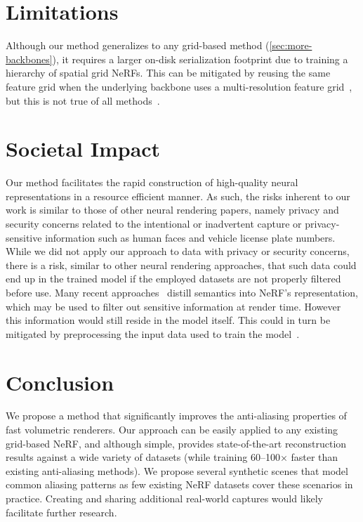 \documentclass{article}
\begin{document}
\section{Limitations}
\label{sec:limitations}

Although our method generalizes to any grid-based method (\cref{sec:more-backbones}), it requires a larger on-disk serialization footprint due to training a hierarchy of spatial grid NeRFs. This can be mitigated by reusing the same feature grid when the underlying backbone uses a multi-resolution feature grid~\cite{mueller2022instant, kplanes_2023}, but this is not true of all methods~\cite{Chen2022ECCV, yu_and_fridovichkeil2021plenoxels}.

\section{Societal Impact}

Our method facilitates the rapid construction of high-quality neural representations in a resource efficient manner. As such, the risks inherent to our work is similar to those of other neural rendering papers, namely privacy and security concerns related to the intentional or inadvertent capture or privacy-sensitive information such as human faces and vehicle license plate numbers. While we did not apply our approach to data with privacy or security concerns, there is a risk, similar to other neural rendering approaches, that such data could end up in the trained model if the employed datasets are not properly filtered before use. Many recent approaches~\cite{Zhi:etal:ICCV2021, kobayashi2022distilledfeaturefields, tschernezki22neural, turki2023suds, lerf2023} distill semantics into NeRF's representation, which may be used to filter out sensitive information at render time. However this information would still reside in the model itself. This could in turn be mitigated by preprocessing the input data used to train the model~\cite{10.1145/3083187.3083192}.

\section{Conclusion}

We propose a method that significantly improves the anti-aliasing properties of fast volumetric renderers.
Our approach can be easily applied to any existing grid-based NeRF, and although simple, provides state-of-the-art reconstruction results against a wide variety of datasets (while training 60--100× faster than existing anti-aliasing methods).
We propose several synthetic scenes that model common aliasing patterns as few existing NeRF datasets cover these scenarios in practice. Creating and sharing additional real-world captures would likely facilitate further research.
\end{document}

